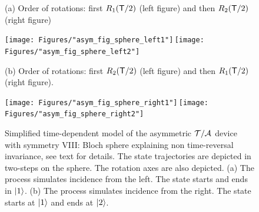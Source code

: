 \begin{figure}
  (a) Order of rotations:  first  $R_1({\sf T}/2)$ (left figure) and then $R_2({\sf T}/2)$ (right figure)
  \begin{center}
  \texttt{[image: Figures/"asym\_fig\_sphere\_left1"]}\,\texttt{[image: Figures/"asym\_fig\_sphere\_left2"]}\\[0.1cm]
  \end{center}
  (b) Order of rotations: first $R_2({\sf T}/2)$ (left figure) and then $R_1({\sf T}/2)$ (right figure).
  \begin{center}
  \texttt{[image: Figures/"asym\_fig\_sphere\_right1"]}\,\texttt{[image: Figures/"asym\_fig\_sphere\_right2"]}
  \end{center}
  \vspace*{-.8cm}
  \caption{Simplified time-dependent model of the asymmetric ${\cal T/A}$ device with symmetry VIII: Bloch sphere explaining non time-reversal invariance, see text for details. The state trajectories are depicted in two-steps on the sphere. The rotation axes are
  also depicted. (a) The process simulates incidence from the left. The state starts and ends in $|1\rangle$. (b) The process simulates incidence from the right. The state starts at $|1\rangle$ and ends at $|2\rangle$.
  \label{fig_t_a_simple2}}
\end{figure}


